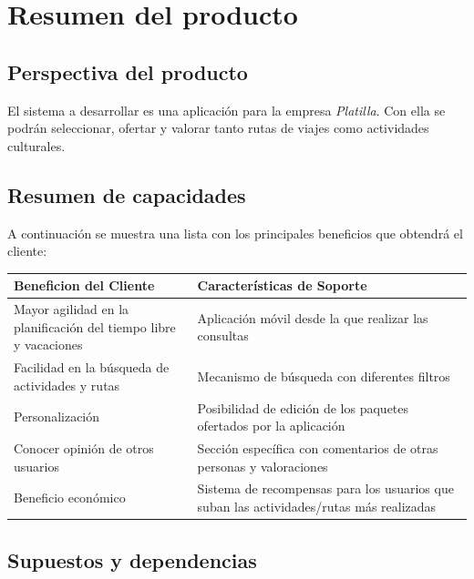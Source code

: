 \documentclass[11pt]{article}
\begin{document}

\section{Resumen del producto}\label{4}
\subsection{Perspectiva del producto}
El sistema a desarrollar es una aplicación para la empresa \textit{Platilla}. Con ella se podrán seleccionar, ofertar y valorar tanto rutas de viajes como actividades culturales.


\subsection{Resumen de capacidades}
A continuación se muestra una lista con los principales beneficios que obtendrá el cliente:

\begin{table}[H]
	\centering
	\begin{tabular}{p{0.4\linewidth}p{0.6\linewidth}}
		\toprule
		\textbf{Beneficion del Cliente} & \textbf{Características de Soporte} \\
		\midrule
		Mayor agilidad en la planificación del tiempo libre y vacaciones & Aplicación móvil desde la que realizar las consultas \\
		Facilidad en la búsqueda de actividades y rutas & Mecanismo de búsqueda con diferentes filtros \\
		Personalización & Posibilidad de edición de los paquetes ofertados por la aplicación \\
		Conocer opinión de otros usuarios & Sección específica con comentarios de otras personas y valoraciones\\
		Beneficio económico & Sistema de recompensas para los usuarios que suban las actividades/rutas más realizadas \\
		
		\bottomrule
	\end{tabular}
\end{table}

\subsection{Supuestos y dependencias}
\end{document}
